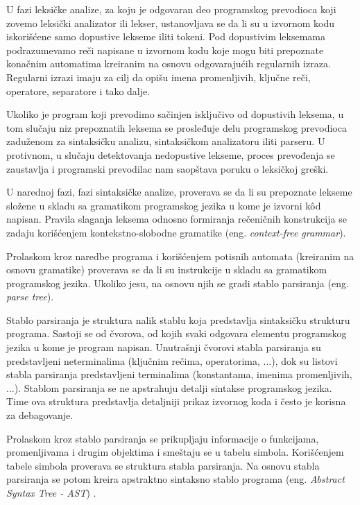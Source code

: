\documentclass[12pt,oneside]{memoir}
\begin{document}
U fazi leksičke analize, za koju je odgovaran deo programskog prevodioca koji zovemo leksički 
analizator ili lekser, ustanovljava se da li su u izvornom kodu iskorišćene samo dopustive 
lekseme iliti tokeni. Pod dopustivim leksemama podrazumevamo reči napisane u izvornom kodu 
koje mogu biti prepoznate konačnim automatima kreiranim na osnovu odgovarajućih regularnih 
izraza. Regularni izrazi imaju za cilj da opišu imena promenljivih, ključne reči, operatore, 
separatore i tako dalje. 

Ukoliko je program koji prevodimo sačinjen isključivo od dopustivih 
leksema, u tom slučaju niz prepoznatih leksema se prosleđuje delu programskog prevodioca 
zaduženom za sintaksičku analizu, sintaksičkom analizatoru iliti parseru. U protivnom, u 
slučaju detektovanja nedopustive lekseme, proces prevođenja se zaustavlja i programski 
prevodilac nam saopštava poruku o leksičkoj greški. 

U narednoj fazi, fazi sintaksičke analize, proverava se da li su prepoznate lekseme složene u 
skladu sa gramatikom programskog jezika u kome je izvorni k\^od napisan. 
Pravila slaganja leksema odnosno formiranja rečeničnih konstrukcija se zadaju korišćenjem 
kontekstno-slobodne gramatike (eng. \textit{context-free grammar}). 

Prolaskom kroz naredbe programa i korišćenjem potisnih automata (kreiranim na osnovu gramatike) proverava se da li su instrukcije u skladu sa gramatikom programskog jezika. Ukoliko jesu, na osnovu njih se gradi stablo parsiranja (eng. \textit{parse tree}). 

Stablo parsiranja je struktura nalik stablu koja predstavlja sintaksičku strukturu programa. Sastoji se od čvorova, od kojih svaki odgovara elementu programskog jezika u kome je program napisan. Unutrašnji čvorovi stabla parsiranja su predstavljeni neterminalima (ključnim rečima, operatorima, ...), dok su listovi stabla parsiranja predstavljeni terminalima (konstantama, imenima promenljivih, ...). Stablom parsiranja se ne apstrahuju detalji sintakse programskog jezika. Time ova struktura predstavlja detaljniji prikaz izvornog koda i često je korisna za debagovanje. 

Prolaskom kroz stablo parsiranja se prikupljaju informacije o funkcijama, promenljivama i drugim objektima i smeštaju se u tabelu simbola. Korišćenjem tabele simbola proverava se struktura stabla parsiranja. Na osnovu stabla parsiranja se potom kreira apstraktno sintaksno stablo programa (eng. \textit{Abstract Syntax Tree - AST}) \cite{ast}. 
\end{document}
